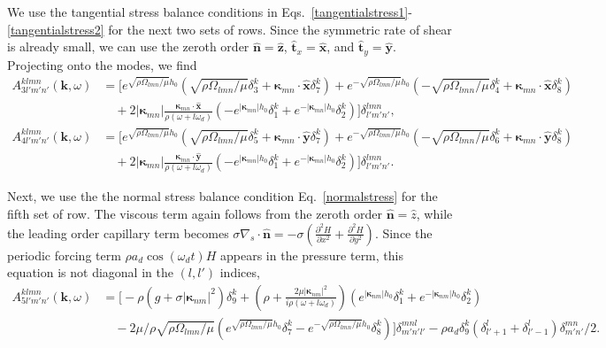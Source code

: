 \documentclass[aps,pre,amsmath,amssymb,floatfix,onecolumn,notitlepage,10pt]{revtex4-1}
\begin{document}
We use the tangential stress balance conditions in Eqs.~\eqref{tangentialstress1}-\eqref{tangentialstress2} for the next two sets of rows. Since the symmetric rate of shear is already small,  we can use the zeroth order $\hat{\mathbf{n}}=\hat{\mathbf{z}}$, $\hat{\mathbf{t}}_x=\hat{\mathbf{x}}$, and $\hat{\mathbf{t}}_y=\hat{\mathbf{y}}$. Projecting onto the modes, we find
\begin{align}
A^{klmn}_{3l'm'n'}(\mathbf{k}, \omega) &=\Big[ e^{\sqrt{\rho\Omega_{lmn}/\mu}h_0}(\sqrt{\rho\Omega_{lmn}/\mu}\delta^k_3 + \bm{\kappa}_{mn}\cdot \hat{\mathbf{x}}\delta^k_7) + e^{-\sqrt{\rho\Omega_{lmn}/\mu}h_0}(-\sqrt{\rho\Omega_{lmn}/\mu}\delta^k_4 + \bm{\kappa}_{mn}\cdot \hat{\mathbf{x}}\delta^k_8) \nonumber \\
&\quad + 2|\bm{\kappa}_{mn}| \frac{\bm{\kappa}_{mn}\cdot \hat{\mathbf{x}}}{\rho(\omega + l \omega_d)} \left(-e^{|\bm{\kappa}_{mn}|h_0} \delta^k_1 + e^{-|\bm{\kappa}_{mn}|h_0} \delta^k_2 \right)\Big] \delta^{lmn}_{l'm'n'},   \\
A^{klmn}_{4l'm'n'}(\mathbf{k}, \omega)  &=  \Big[e^{\sqrt{\rho\Omega_{lmn}/\mu}h_0}(\sqrt{\rho\Omega_{lmn}/\mu}\delta^k_5 + \bm{\kappa}_{mn}\cdot \hat{\mathbf{y}}\delta^k_7) + e^{-\sqrt{\rho\Omega_{lmn}/\mu}h_0}(-\sqrt{\rho\Omega_{lmn}/\mu}\delta^k_6 + \bm{\kappa}_{mn}\cdot \hat{\mathbf{y}}\delta^k_8) \nonumber \\
&\quad + 2|\bm{\kappa}_{mn}| \frac{\bm{\kappa}_{mn}\cdot \hat{\mathbf{y}}}{\rho(\omega + l \omega_d)} \left(-e^{|\bm{\kappa}_{mn}|h_0} \delta^k_1 + e^{-|\bm{\kappa}_{mn}|h_0} \delta^k_2 \right)\Big] \delta^{lmn}_{l'm'n'}.
\end{align}

Next, we use the the normal stress balance condition Eq.~\eqref{normalstress} for the fifth set of row. The viscous term again follows from the zeroth order $\hat{\mathbf{n}}=\hat{z}$, while the leading order capillary term becomes $\sigma \nabla_s \cdot \hat{\mathbf{n}} = -\sigma \left(\frac{\partial^2 H}{\partial x^2}+\frac{\partial^2 H}{\partial y^2}\right)$. Since the periodic forcing term $\rho a_d \cos(\omega_d t)H$ appears in the pressure term, this equation is not diagonal in the $(l,l')$ indices,
\begin{align}
A^{klmn}_{5l'm'n'}(\mathbf{k}, \omega) &= \Big[ -\rho (g+\sigma|\bm{\kappa}_{nm}|^2)\delta^k_9 + \left(\rho+\frac{2\mu|\bm{\kappa}_{nm}|^2}{i\rho(\omega+l\omega_d)}\right)\left(e^{|\bm{\kappa}_{nm}|h_0}\delta^k_1 + e^{-|\bm{\kappa}_{nm}|h_0}\delta^k_2 \right) \nonumber \\
&\quad - 2\mu/\rho\sqrt{\rho\Omega_{lmn}/\mu}\left(e^{\sqrt{\rho\Omega_{lmn}/\mu}h_0}\delta^k_7 - e^{-\sqrt{\rho\Omega_{lmn}/\mu}h_0}\delta^k_8\right)\Big]\delta^{mnl}_{m'n'l'}-\rho a_d \delta^k_9 (\delta^l_{l'+1}+\delta^l_{l'-1})\delta^{mn}_{m'n'}/2. \label{lnormalstress}
\end{align}
\end{document}
